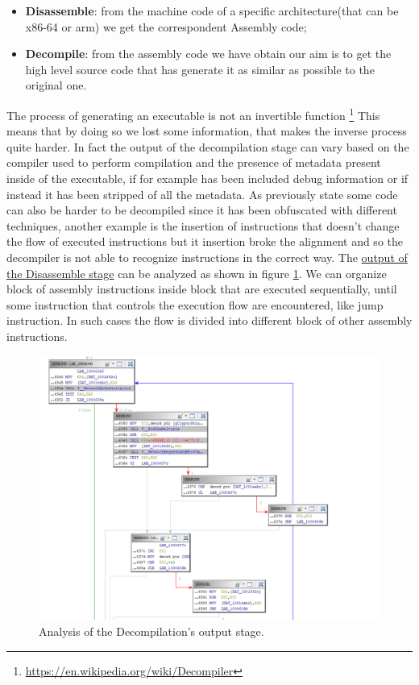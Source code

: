 \documentclass{article}
\begin{document}
\begin{itemize}
    \item \textbf{Disassemble}: from the machine code of a specific architecture(that can be x86-64 or arm) we get the correspondent Assembly code;
    \item \textbf{Decompile}: from the assembly code we have obtain our aim is to get the high level source code that has generate it as similar as possible to the original one.
\end{itemize}
The process of generating an executable is not an invertible function \footnote{\url{https://en.wikipedia.org/wiki/Decompiler}} This means that by doing so we lost some information, that makes the inverse process quite harder.
In fact the output of the decompilation stage can vary based on the compiler used to perform compilation and the presence of metadata present inside of the executable, if for example has been included debug information or if instead it has been stripped of all the metadata. 
As previously state some code can also be harder to be decompiled since it has been obfuscated with different techniques, another example is the insertion of instructions that doesn't change the flow of executed instructions but it insertion broke the alignment and so the decompiler is not able to recognize instructions in the correct way.
The \underline{output of the Disassemble stage} can be analyzed as shown in figure \ref{fig:decompilationoutput}. We can organize block of assembly instructions inside block that are executed sequentially, until some instruction that controls the execution flow are encountered, like jump instruction.
In such cases the flow is divided into different block of other assembly instructions.
\begin{figure}[htp]
    \centering
    \includegraphics[width=1\textwidth]{images/graphview.png}
    \caption{Analysis of the Decompilation's output stage.}
    \label{fig:decompilationoutput}
\end{figure}
\end{document}
